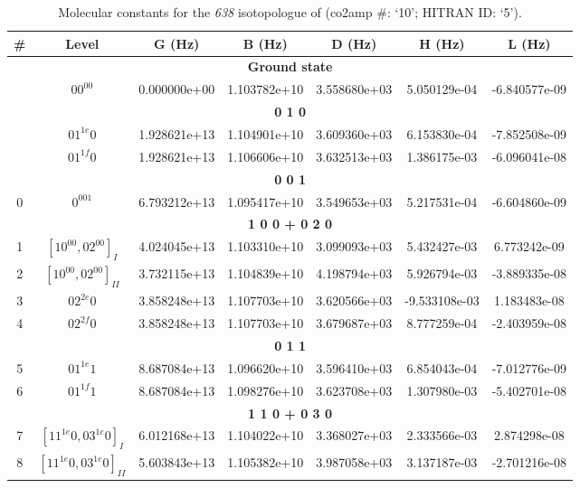 \begin{table}[h!]
\caption{Molecular constants for the \textit{638} isotopologue of  (co2amp \#: ‘10’; HITRAN ID: ‘5’).}
\label{table:constants_638}
\centering
\begin{tabular}{|c|c|c|c|c|c|c|}
\hline
\textbf{\#} & \textbf{Level} & \textbf{G (Hz)} & \textbf{B (Hz)} & \textbf{D (Hz)} & \textbf{H (Hz)} & \textbf{L (Hz)} \\ \hline
\multicolumn{7}{|c|}{\textbf{Ground state}} \\ \hline
 & $00^00$ & 0.000000e+00 & 1.103782e+10 & 3.558680e+03 & 5.050129e-04 & -6.840577e-09 \\ \hline
\multicolumn{7}{|c|}{\textbf{0 1 0}} \\ \hline
 & $01^{1e}0$ & 1.928621e+13 & 1.104901e+10 & 3.609360e+03 & 6.153830e-04 & -7.852508e-09 \\ \hline
 & $01^{1f}0$ & 1.928621e+13 & 1.106606e+10 & 3.632513e+03 & 1.386175e-03 & -6.096041e-08 \\ \hline
\multicolumn{7}{|c|}{\textbf{0 0 1}} \\ \hline
0 & $0^001$ & 6.793212e+13 & 1.095417e+10 & 3.549653e+03 & 5.217531e-04 & -6.604860e-09 \\ \hline
\multicolumn{7}{|c|}{\textbf{1 0 0 + 0 2 0}} \\ \hline
1 & $[10^00, 02^00]_{I}$ & 4.024045e+13 & 1.103310e+10 & 3.099093e+03 & 5.432427e-03 & 6.773242e-09 \\ \hline
2 & $[10^00, 02^00]_{II}$ & 3.732115e+13 & 1.104839e+10 & 4.198794e+03 & 5.926794e-03 & -3.889335e-08 \\ \hline
3 & $02^{2e}0$ & 3.858248e+13 & 1.107703e+10 & 3.620566e+03 & -9.533108e-03 & 1.183483e-08 \\ \hline
4 & $02^{2f}0$ & 3.858248e+13 & 1.107703e+10 & 3.679687e+03 & 8.777259e-04 & -2.403959e-08 \\ \hline
\multicolumn{7}{|c|}{\textbf{0 1 1}} \\ \hline
5 & $01^{1e}1$ & 8.687084e+13 & 1.096620e+10 & 3.596410e+03 & 6.854043e-04 & -7.012776e-09 \\ \hline
6 & $01^{1f}1$ & 8.687084e+13 & 1.098276e+10 & 3.623708e+03 & 1.307980e-03 & -5.402701e-08 \\ \hline
\multicolumn{7}{|c|}{\textbf{1 1 0 + 0 3 0}} \\ \hline
7 & $[11^{1e}0, 03^{1e}0]_{I}$ & 6.012168e+13 & 1.104022e+10 & 3.368027e+03 & 2.333566e-03 & 2.874298e-08 \\ \hline
8 & $[11^{1e}0, 03^{1e}0]_{II}$ & 5.603843e+13 & 1.105382e+10 & 3.987058e+03 & 3.137187e-03 & -2.701216e-08 \\ \hline

\end{tabular}
\end{table}
